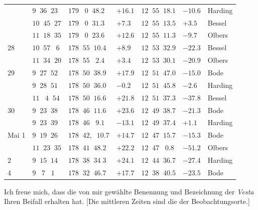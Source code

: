 \begin{longtable}{l|l|l|l|l|l|l}
        & $9\;\;36\;\;23$ & $179\;\;\;0\;\;48.2$ & $+16.1$ & $12\;\;55\;\;18.1$ & $-10.6$ & Harding \\
        & $10\;\;45\;\;27$ & $179\;\;\;0\;\;31.3$ & $+7.3$ & $12\;\;55\;\;13.5$ & $+3.5$ & Bessel \\
        & $11\;\;18\;\;35$ & $179\;\;\;0\;\;23.6$ & $+12.6$ & $12\;\;55\;\;11.3$ & $-9.7$ & Olbers \\
28      & $10\;\;57\;\;\;6$ & $178\;\;55\;\;10.4$ & $+8.9$ & $12\;\;53\;\;32.9$ & $-22.3$ & Bessel \\
        & $11\;\;34\;\;20$ & $178\;\;55\;\;\;2.4$ & $+3.4$ & $12\;\;53\;\;30.1$ & $-20.9$ & Olbers \\
29      & $9\;\;27\;\;52$ & $178\;\;50\;\;38.9$ & $+17.9$ & $12\;\;51\;\;47.0$ & $-15.0$ & Bode \\
        & $9\;\;28\;\;51$ & $178\;\;50\;\;36.0$ & $-0.2$ & $12\;\;51\;\;45.8$ & $-2.6$ & Harding \\
        & $11\;\;\;4\;\;54$ & $178\;\;50\;\;16.6$ & $+21.8$ & $12\;\;51\;\;37.3$ & $-37.8$ & Bessel \\
30      & $9\;\;23\;\;38$ & $178\;\;46\;\;11.6$ & $+23.6$ & $12\;\;49\;\;38.7$ & $-21.3$ & Bode \\
        & $9\;\;23\;\;39$ & $178\;\;46\;\;\;9.1$ & $-13.1$ & $12\;\;49\;\;37.4$ & $+1.1$ & Harding \\
Mai 1   & $9\;\;19\;\;26$ & $178\;\;42,\;\;10.7$ & $+14.7$ & $12\;\;47\;\;15.7$ & $-15.3$ & Bode \\
        & $11\;\;23\;\;35$ & $178\;\;41\;\;48.2$ & $+22.2$ & $12\;\;47\;\;\;0.8$ & $-51.2$ & Olbers \\
2       & $9\;\;15\;\;14$ & $178\;\;38\;\;34\;3$ & $+24.1$ & $12\;\;44\;\;36.7$ & $-27.4$ & Harding \\
4       & $9\;\;\;7\;\;\;1$ & $178\;\;32\;\;46.7$ & $+17.7$ & $12\;\;38\;\;40.5$ & $-23.5$ & Bode \\
\end{longtable}\endgroup

\par\indent Ich freue mich, dass die von mir gewählte Benennung und Bezeichnung der \emph{Vesta} Ihren Beifall
erhalten hat. [Die mittleren Zeiten sind die der Beobachtungsorte.]
